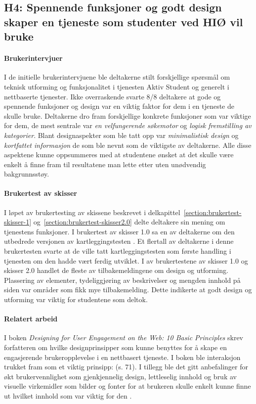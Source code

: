 \subsection{H4: Spennende funksjoner og godt design skaper en tjeneste som studenter ved HIØ vil bruke}

\paragraph{Brukerintervjuer}
I de initielle brukerintervjuene ble deltakerne stilt forskjellige spørsmål om teknisk utforming og funksjonalitet i tjenesten Aktiv Student og generelt i nettbaserte tjenester. Ikke overraskende svarte 8/8 deltakere at gode og spennende funksjoner og design var en viktig faktor for dem i en tjeneste de skulle bruke. Deltakerne dro fram forskjellige konkrete funksjoner som var viktige for dem, de mest sentrale var {\em en velfungerende søkemotor} og {\em logisk fremstilling av kategorier}. Blant designaspekter som ble tatt opp var {\em minimalistisk design} og {\em kortfattet informasjon} de som ble nevnt som de viktigste av deltakerne. Alle disse aspektene kunne oppsummeres med at studentene ønsket at det skulle være enkelt å finne fram til resultatene man lette etter uten unødvendig bakgrunnsstøy.

\paragraph{Brukertest av skisser}
I løpet av brukertesting av skissene beskrevet i delkapittel~\ref{section:brukertest-skisser-1} og~\ref{section:brukertest-skisser2.0} delte deltakere sin mening om tjenestens funksjoner. I brukertest av skisser 1.0 sa en av deltakerne om den utbedrede versjonen av kartleggingstesten . Et flertall av deltakerne i denne brukertesten svarte at de ville tatt kartleggingstesten som første handling i tjenesten om den hadde vært ferdig utviklet. I av brukertestene av skisser 1.0 og skisser 2.0 handlet de fleste av tilbakemeldingene om design og utforming. Plassering av elementer, tydeliggjøring av beskrivelser og mengden innhold på siden var områder som fikk mye tilbakemelding. Dette indikerte at godt design og utforming var viktig for studentene som deltok.

\paragraph{Relatert arbeid}
I boken {\em Designing for User Engagement on the Web: 10 Basic Principles} skrev forfatteren om hvilke designprinsipper som kunne benyttes for å skape en engasjerende brukeropplevelse i en nettbasert tjeneste. I boken ble interaksjon trukket fram som et viktig prinsipp:  (s. 71). I tillegg ble det gitt anbefalinger for økt brukervennlighet som gjenkjennelig design, lettleselig innhold og bruk av visuelle virkemidler som bilder og fonter for at brukeren skulle enkelt kunne finne ut hvilket innhold som var viktig for den \cite{ENGAGEMENT-WEB:17}. 

